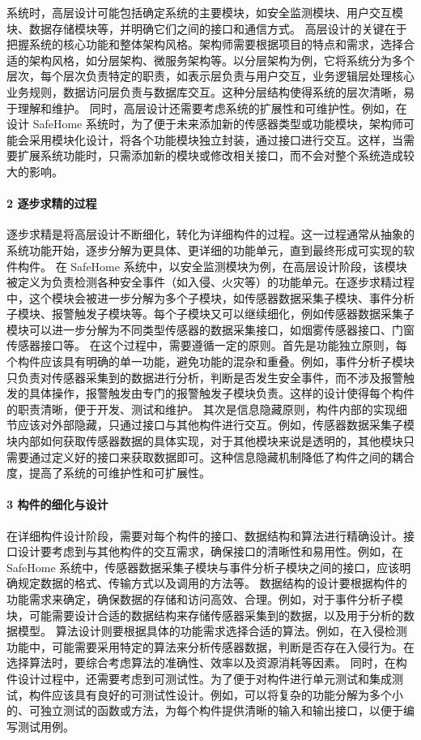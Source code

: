 系统时，高层设计可能包括确定系统的主要模块，如安全监测模块、用户交互模块、数据存储模块等，并明确它们之间的接口和通信方式。 高层设计的关键在于把握系统的核心功能和整体架构风格。架构师需要根据项目的特点和需求，选择合适的架构风格，如分层架构、微服务架构等。以分层架构为例，它将系统分为多个层次，每个层次负责特定的职责，如表示层负责与用户交互，业务逻辑层处理核心业务规则，数据访问层负责与数据库交互。这种分层结构使得系统的层次清晰，易于理解和维护。 同时，高层设计还需要考虑系统的扩展性和可维护性。例如，在设计 SafeHome 系统时，为了便于未来添加新的传感器类型或功能模块，架构师可能会采用模块化设计，将各个功能模块独立封装，通过接口进行交互。这样，当需要扩展系统功能时，只需添加新的模块或修改相关接口，而不会对整个系统造成较大的影响。 \paragraph{2 逐步求精的过程}\label{ux9010ux6b65ux6c42ux7cbeux7684ux8fc7ux7a0b} 逐步求精是将高层设计不断细化，转化为详细构件的过程。这一过程通常从抽象的系统功能开始，逐步分解为更具体、更详细的功能单元，直到最终形成可实现的软件构件。 在 SafeHome 系统中，以安全监测模块为例，在高层设计阶段，该模块被定义为负责检测各种安全事件（如入侵、火灾等）的功能单元。在逐步求精过程中，这个模块会被进一步分解为多个子模块，如传感器数据采集子模块、事件分析子模块、报警触发子模块等。每个子模块又可以继续细化，例如传感器数据采集子模块可以进一步分解为不同类型传感器的数据采集接口，如烟雾传感器接口、门窗传感器接口等。 在这个过程中，需要遵循一定的原则。首先是功能独立原则，每个构件应该具有明确的单一功能，避免功能的混杂和重叠。例如，事件分析子模块只负责对传感器采集到的数据进行分析，判断是否发生安全事件，而不涉及报警触发的具体操作，报警触发由专门的报警触发子模块负责。这样的设计使得每个构件的职责清晰，便于开发、测试和维护。 其次是信息隐藏原则，构件内部的实现细节应该对外部隐藏，只通过接口与其他构件进行交互。例如，传感器数据采集子模块内部如何获取传感器数据的具体实现，对于其他模块来说是透明的，其他模块只需要通过定义好的接口来获取数据即可。这种信息隐藏机制降低了构件之间的耦合度，提高了系统的可维护性和可扩展性。 \paragraph{3 构件的细化与设计}\label{ux6784ux4ef6ux7684ux7ec6ux5316ux4e0eux8bbeux8ba1} 在详细构件设计阶段，需要对每个构件的接口、数据结构和算法进行精确设计。接口设计要考虑到与其他构件的交互需求，确保接口的清晰性和易用性。例如，在 SafeHome 系统中，传感器数据采集子模块与事件分析子模块之间的接口，应该明确规定数据的格式、传输方式以及调用的方法等。 数据结构的设计要根据构件的功能需求来确定，确保数据的存储和访问高效、合理。例如，对于事件分析子模块，可能需要设计合适的数据结构来存储传感器采集到的数据，以及用于分析的数据模型。 算法设计则要根据具体的功能需求选择合适的算法。例如，在入侵检测功能中，可能需要采用特定的算法来分析传感器数据，判断是否存在入侵行为。在选择算法时，要综合考虑算法的准确性、效率以及资源消耗等因素。 同时，在构件设计过程中，还需要考虑到可测试性。为了便于对构件进行单元测试和集成测试，构件应该具有良好的可测试性设计。例如，可以将复杂的功能分解为多个小的、可独立测试的函数或方法，为每个构件提供清晰的输入和输出接口，以便于编写测试用例。

